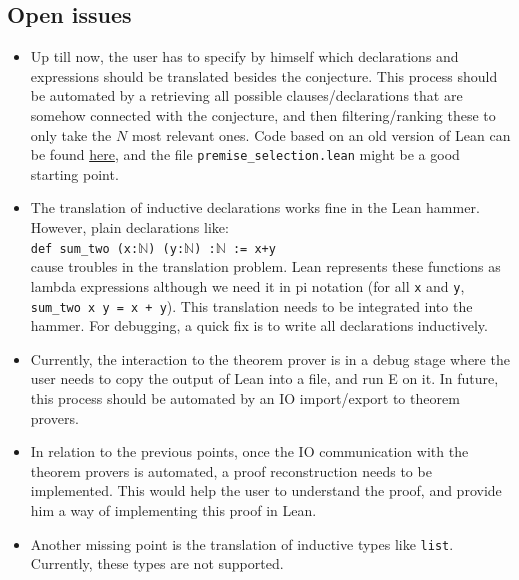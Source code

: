 \documentclass[a4paper]{article}
\begin{document}
\subsection{Open issues}
\begin{itemize}
	\item Up till now, the user has to specify by himself which declarations and expressions should be translated besides the conjecture. This process should be automated by a retrieving all possible clauses/declarations that are somehow connected with the conjecture, and then filtering/ranking these to only take the $N$ most relevant ones. Code based on an old version of Lean can be found \href{https://github.com/robertylewis/relevance_filter/tree/dev_lean_reparam}{here}, and the file \texttt{premise\_selection.lean} might be a good starting point.
	\item The translation of inductive declarations works fine in the Lean hammer. However, plain declarations like:\\
	\texttt{def sum\_two (x:$\mathbb{N}$) (y:$\mathbb{N}$) :$\mathbb{N}$ := x+y}\\
	cause troubles in the translation problem. Lean represents these functions as lambda expressions although we need it in pi notation (for all \texttt{x} and \texttt{y}, \texttt{sum\_two x y = x + y}). This translation needs to be integrated into the hammer. For debugging, a quick fix is to write all declarations inductively.
	\item Currently, the interaction to the theorem prover is in a debug stage where the user needs to copy the output of Lean into a file, and run E on it. In future, this process should be automated by an IO import/export to theorem provers.
	\item In relation to the previous points, once the IO communication with the theorem provers is automated, a proof reconstruction needs to be implemented. This would help the user to understand the proof, and provide him a way of implementing this proof in Lean.
	\item Another missing point is the translation of inductive types like \texttt{list}. Currently, these types are not supported.
\end{itemize}



\newpage
\end{document}
